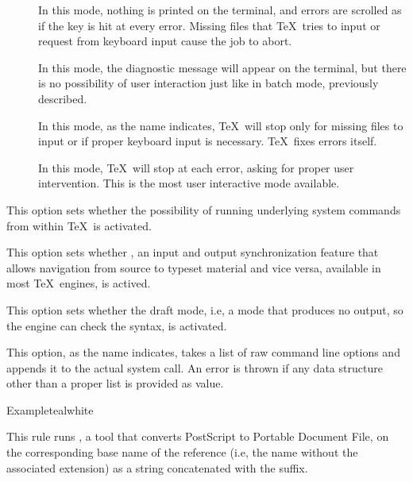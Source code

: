 \begin{description}
\begin{description}
\begin{description}
\item[] In this mode, nothing is printed on the terminal, and errors are scrolled as if the  key is hit at every error. Missing files that \TeX\ tries to input or request from keyboard input cause the job to abort.

\item[] In this mode, the diagnostic message will appear on the terminal, but there is no possibility of user interaction just like in batch mode, previously described.

\item[] In this mode, as the name indicates, \TeX\ will stop only for missing files to input or if proper keyboard input is necessary. \TeX\ fixes errors itself.

\item[] In this mode, \TeX\ will stop at each error, asking for proper user intervention. This is the most user interactive mode available.
\end{description}

\item[\rpsbox{shell}] This option sets whether the possibility of running underlying system commands from within \TeX\ is activated.

\item[\rpsbox{synctex}] This option sets whether , an input and output synchronization feature that allows navigation from source to typeset material and vice versa, available in most \TeX\ engines, is actived.

\item[\rpsbox{draft}] This option sets whether the draft mode, i.e, a mode that produces no output, so the engine can check the syntax, is activated.

\item[\abox{options}] This option, as the name indicates, takes a list of raw command line options and appends it to the actual system call. An error is thrown if any data structure other than a proper list is provided as value.
\end{description}

\begin{codebox}{Example}{teal}{\icnote}{white}
\end{codebox}


\item[\rulebox{ps2pdf}{Marco Daniel, Paulo Cereda}] This rule runs , a tool that converts PostScript to Portable Document File, on the corresponding base name of the  reference (i.e, the name without the associated extension) as a string concatenated with the  suffix.


\end{description}

